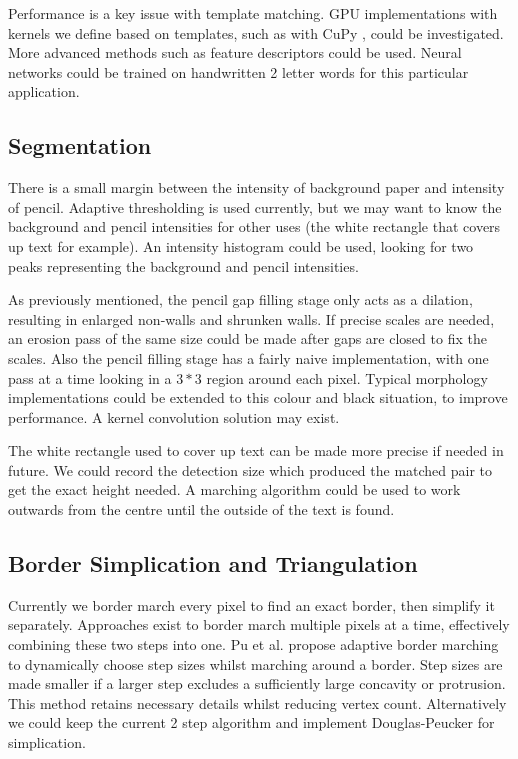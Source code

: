 \documentclass[conference]{IEEEtran}
\begin{document}
Performance is a key issue with template matching. GPU implementations with kernels we define based on templates, such as with CuPy \cite{cupy2015user}, could be investigated. More advanced methods such as feature descriptors could be used. Neural networks could be trained on handwritten 2 letter words for this particular application.

\subsection{Segmentation}

There is a small margin between the intensity of background paper and intensity of pencil. Adaptive thresholding is used currently, but we may want to know the background and pencil intensities for other uses (the white rectangle that covers up text for example). An intensity histogram could be used, looking for two peaks representing the background and pencil intensities.

As previously mentioned, the pencil gap filling stage only acts as a dilation, resulting in enlarged non-walls and shrunken walls. If precise scales are needed, an erosion pass of the same size could be made after gaps are closed to fix the scales. Also the pencil filling stage has a fairly naive implementation, with one pass at a time looking in a $3*3$ region around each pixel. Typical morphology implementations could be extended to this colour and black situation, to improve performance. A kernel convolution solution may exist.

The white rectangle used to cover up text can be made more precise if needed in future. We could record the detection size which produced the matched pair to get the exact height needed. A marching algorithm could be used to work outwards from the centre until the outside of the text is found.

\subsection{Border Simplication and Triangulation}

Currently we border march every pixel to find an exact border, then simplify it separately. Approaches exist to border march multiple pixels at a time, effectively combining these two steps into one. Pu et al. \cite{pu2008adaptive} propose adaptive border marching to dynamically choose step sizes whilst marching around a border. Step sizes are made smaller if a larger step excludes a sufficiently large concavity or protrusion. This method retains necessary details whilst reducing vertex count. Alternatively we could keep the current 2 step algorithm and implement Douglas-Peucker \cite{douglas1973algorithms} for simplication.
\end{document}
